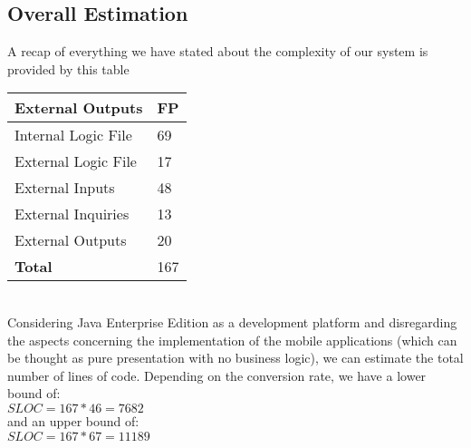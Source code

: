\subsection{Overall Estimation}
A recap of everything we have stated about the complexity of our system is provided by this table\\
\begin{tabular}{|l|l|}
\hline
\textbf{External Outputs} & \textbf{FP} \\
\hline

Internal Logic File & 69\\
External Logic File & 17\\
External Inputs & 48\\
External Inquiries & 13\\
External Outputs & 20\\
\hline
\textbf{Total} & 167\\
\hline
\end{tabular}
\\
Considering Java Enterprise Edition as a development platform and disregarding the aspects concerning the implementation of the mobile applications (which can be thought as pure presentation with no business logic), we can estimate the total number of lines of code. Depending on the conversion rate, we have a lower bound of: \\
$ SLOC = 167 * 46 = 7 682$\\
and an upper bound of:\\
$ SLOC = 167 * 67 = 11 189$\\